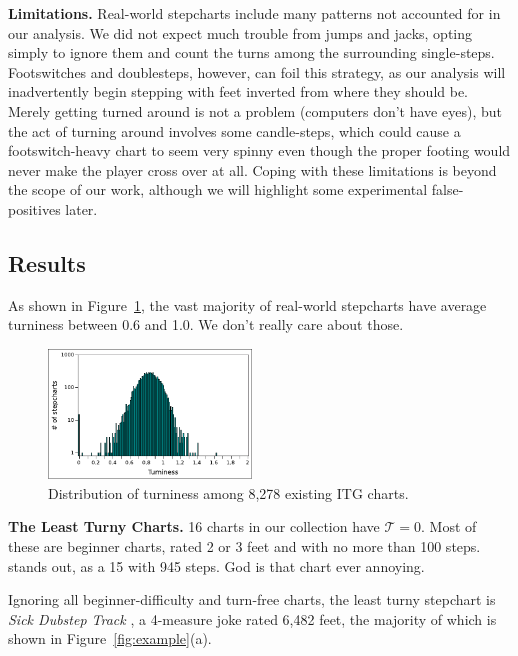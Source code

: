 \documentclass[10pt]{sigplanconf}
\begin{document}
{\bf Limitations.}
Real-world stepcharts include many patterns not accounted for in our analysis. We did not expect much trouble from jumps and jacks, opting simply to ignore them and count the turns among the surrounding single-steps.
Footswitches and doublesteps, however, can foil this strategy, as our analysis will inadvertently begin stepping with feet inverted from where they should be.
Merely getting turned around is not a problem (computers don't have eyes), but the act of turning around involves some candle-steps, which could cause a footswitch-heavy chart to seem very spinny even though the proper footing would never make the player cross over at all.
Coping with these limitations is beyond the scope of our work, although we will highlight some experimental false-positives later.

\subsection{Results}

As shown in Figure~\ref{fig:distribution}, the vast majority of real-world stepcharts have average turniness between 0.6 and 1.0.
We don't really care about those.

\begin{figure}[t]
	\begin{center}
	\includegraphics[width=0.48\textwidth]{realworld.pdf}
	\end{center}
	\caption{Distribution of turniness among 8,278 existing ITG charts.}
	\label{fig:distribution}
\end{figure}

{\bf The Least Turny Charts.}
16 charts in our collection have $\mathcal{T}=0$. Most of these are beginner charts, rated 2 or 3 feet and with no more than 100 steps. \cite{deltamax} stands out, as a 15 with 945 steps. God is that chart ever annoying.

Ignoring all beginner-difficulty and turn-free charts, the least turny stepchart is {\em Sick Dubstep Track} \cite{sickdubstep}, a 4-measure joke rated 6,482 feet, the majority of which is shown in Figure~\ref{fig:example}(a).
\end{document}
